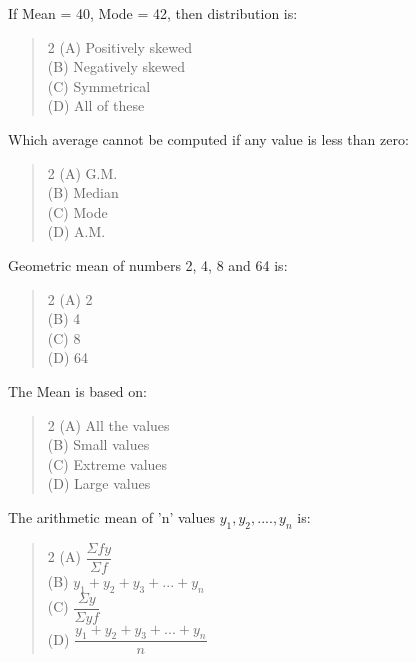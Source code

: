 \documentclass[11pt,a4paper]{article}
\begin{document}
\begin{mcqlist}
\item If Mean = 40, Mode = 42, then distribution is:
\begin{quote}\begin{multicols}{2}
\noindent (A) Positively skewed \\
(B) Negatively skewed \\
(C) Symmetrical \\
(D) All of these
\end{multicols}\end{quote}

\item Which average cannot be computed if any value is less than zero:
\begin{quote}\begin{multicols}{2}
\noindent (A) G.M. \\
(B) Median \\
(C) Mode \\
(D) A.M.
\end{multicols}\end{quote}

\item Geometric mean of numbers 2, 4, 8 and 64 is:
\begin{quote}\begin{multicols}{2}
\noindent (A) 2 \\
(B) 4 \\
(C) 8 \\
(D) 64
\end{multicols}\end{quote}

\item The Mean is based on:
\begin{quote}\begin{multicols}{2}
\noindent (A) All the values \\
(B) Small values \\
(C) Extreme values \\
(D) Large values
\end{multicols}\end{quote}

\item The arithmetic mean of 'n' values $y_1, y_2, ...., y_n$ is:
\begin{quote}\begin{multicols}{2}
\noindent (A) $\dfrac{\Sigma fy}{\Sigma f}$ \\
(B) $y_1+y_2+y_3+...+y_n$ \\
(C) $\dfrac{\Sigma y}{\Sigma yf}$ \\
(D) $\dfrac{y_1+y_2+y_3+...+y_n}{n}$
\end{multicols}\end{quote}


\end{mcqlist}
\end{document}
